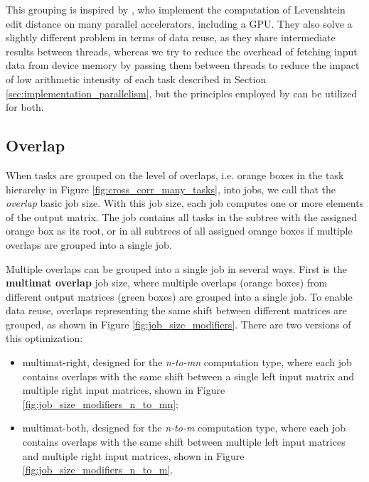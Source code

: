 This grouping is inspired by \citet{paper:levenstein}, who implement the computation of Levenshtein edit distance on many parallel accelerators, including a GPU. They also solve a slightly different problem in terms of data reuse, as they share intermediate results between threads, whereas we try to reduce the overhead of fetching input data from device memory by passing them between threads to reduce the impact of low arithmetic intensity of each task described in Section \ref{sec:implementation_parallelism}, but the principles employed by \citet{paper:levenstein} can be utilized for both.





\subsection{Overlap}
\label{sec:data_reuse_overlap}

When tasks are grouped on the level of overlaps, i.e. orange boxes in the task hierarchy in Figure \ref{fig:cross_corr_many_tasks}, into jobs, we call that the \textit{overlap} basic job size. With this job size, each job computes one or more elements of the output matrix. The job contains all tasks in the subtree with the assigned orange box as its root, or in all subtrees of all assigned orange boxes if multiple overlaps are grouped into a single job.

Multiple overlaps can be grouped into a single job in several ways. First is the \textbf{multimat overlap} job size, where multiple overlaps (orange boxes) from different output matrices (green boxes) are grouped into a single job. To enable data reuse, overlaps representing the same shift between different matrices are grouped, as shown in Figure \ref{fig:job_size_modifiers}. There are two versions of this optimization:
\begin{itemize}
	\item multimat-right, designed for the \textit{n-to-mn} computation type, where each job contains overlaps with the same shift between a single left input matrix and multiple right input matrices, shown in Figure \ref{fig:job_size_modifiers_n_to_mn};
	\item multimat-both, designed for the \textit{n-to-m} computation type, where each job contains overlaps with the same shift between multiple left input matrices and multiple right input matrices, shown in Figure \ref{fig:job_size_modifiers_n_to_m}.
\end{itemize}

